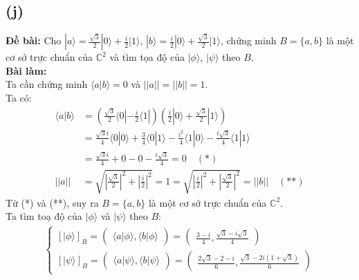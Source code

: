 \subsection{(j)}
\textbf{Đề bài:} Cho $|a\rangle=\frac{\sqrt{3}}{2}|0\rangle+\frac{i}{2}|1\rangle$, $|b\rangle=\frac{i}{2}|0\rangle+\frac{\sqrt{3}}{2}|1\rangle$, chứng minh $B=\{a,b\}$ là một cơ sở trực chuẩn của $\mathbb{C}^{2}$ và tìm tọa độ của $|\phi\rangle$, $|\psi\rangle$ theo $B$.\\
\textbf{Bài làm:}\\
Ta cần chứng minh $\langle a|b\rangle=0$ và $||a||=||b||=1$.\\
Ta có:
\begin{align*}
    \langle a|b\rangle & = \left(\frac{\sqrt{3}}{2}\langle0| - \frac{i}{2}\langle1|\right)\left(\frac{i}{2}|0\rangle + \frac{\sqrt{3}}{2}|1\rangle\right)                                              \\
                       & = \frac{\sqrt{3}i}{4}\langle0|0\rangle + \frac{3}{4}\langle0|1\rangle - \frac{i^{2}}{4}\langle1|0\rangle - \frac{i\sqrt{3}}{4}\langle1|1\rangle                               \\
                       & = \frac{\sqrt{3}i}{4} + 0 - 0 - \frac{i\sqrt{3}}{4} = 0 \quad (\text{*})                                                                                                      \\
    ||a||              & = \sqrt{\left|\frac{\sqrt{3}}{2}\right|^2 + \left|\frac{i}{2}\right|^2} = 1 = \sqrt{\left|\frac{i}{2}\right|^2 + \left|\frac{\sqrt{3}}{2}\right|^2} = ||b|| \quad (\text{**})
\end{align*}
Từ (*) và (**), suy ra $B=\{a,b\}$ là một cơ sở trực chuẩn của $\mathbb{C}^{2}$.\\
Ta tìm toạ độ của $|\phi\rangle$ và $|\psi\rangle$ theo $B$:
\begin{align*}
    \begin{cases}
        [|\phi\rangle]_{B} = \begin{pmatrix}
                                 \langle a|\phi\rangle,
                                 \langle b|\phi\rangle
                             \end{pmatrix} = \begin{pmatrix}
                                                 \frac{3 - i}{4},
                                                 \frac{\sqrt{3} - i\sqrt{3}}{4}
                                             \end{pmatrix} \\
        [|\psi\rangle]_{B} = \begin{pmatrix}
                                 \langle a|\psi\rangle,
                                 \langle b|\psi\rangle
                             \end{pmatrix} = \begin{pmatrix}
                                                 \frac{2\sqrt{3} - 2 - i}{6},
                                                 \frac{\sqrt{3} - 2i(1 + \sqrt{3})}{6}
                                             \end{pmatrix}
    \end{cases}
\end{align*}

